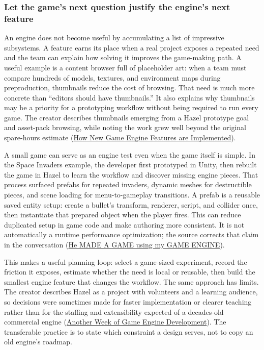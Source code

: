 \subsubsection{Let the game's next question justify the engine's next feature}\label{06-engine-ii-ch041-let-the-games-next-question-justify-the-engines-next-feature}

\hypertarget{06-engine-ii-ch041-let-the-games-next-question-justify-the-engines-next-feature}{}

An engine does not become useful by accumulating a list of impressive subsystems. A feature earns its place when a real project exposes a repeated need and the team can explain how solving it improves the game-making path. A useful example is a content browser full of placeholder art: when a team must compare hundreds of models, textures, and environment maps during preproduction, thumbnails reduce the cost of browsing. That need is much more concrete than ``editors should have thumbnails.'' It also explains why thumbnails may be a priority for a prototyping workflow without being required to run every game. The creator describes thumbnails emerging from a Hazel prototype goal and asset-pack browsing, while noting the work grew well beyond the original spare-hours estimate (\href{https://www.youtube.com/watch?v=z1O6AZWuWm4&t=8m54s}{How New Game Engine Features are Implemented}).

A small game can serve as an engine test even when the game itself is simple. In the Space Invaders example, the developer first prototyped in Unity, then rebuilt the game in Hazel to learn the workflow and discover missing engine pieces. That process surfaced prefabs for repeated invaders, dynamic meshes for destructible pieces, and scene loading for menu-to-gameplay transitions. A prefab is a reusable saved entity setup: create a bullet's transform, renderer, script, and collider once, then instantiate that prepared object when the player fires. This can reduce duplicated setup in game code and make authoring more consistent. It is not automatically a runtime performance optimization; the source corrects that claim in the conversation (\href{https://www.youtube.com/watch?v=56ISmbJE9S4&t=2m10s}{He MADE A GAME using my GAME ENGINE}).

This makes a useful planning loop: select a game-sized experiment, record the friction it exposes, estimate whether the need is local or reusable, then build the smallest engine feature that changes the workflow. The same approach has limits. The creator describes Hazel as a project with volunteers and a learning audience, so decisions were sometimes made for faster implementation or clearer teaching rather than for the staffing and extensibility expected of a decades-old commercial engine (\href{https://www.youtube.com/watch?v=Dr6ly-PO9nM&t=1m45s}{Another Week of Game Engine Development}). The transferable practice is to state which constraint a design serves, not to copy an old engine's roadmap.


